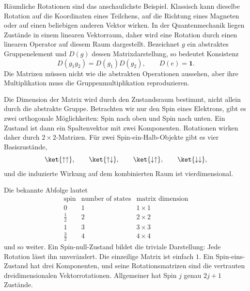 Räumliche Rotationen sind das anschaulichste Beispiel. Klassisch kann dieselbe Rotation auf die Koordinaten eines Teilchens, auf die Richtung eines Magneten oder auf einen beliebigen anderen Vektor wirken. In der Quantenmechanik liegen Zustände in einem linearen Vektorraum, daher wird eine Rotation durch einen linearen Operator auf diesem Raum dargestellt. Bezeichnet \(g\) ein abstraktes Gruppenelement und \(D(g)\) dessen Matrixdarstellung, so bedeutet Konsistenz
\begin{equation}
D(g_1g_2)=D(g_1)D(g_2),
\qquad
D(e)=\boldsymbol 1.
\end{equation}
Die Matrizen müssen nicht wie die abstrakten Operationen aussehen, aber ihre Multiplikation muss die Gruppenmultiplikation reproduzieren.

Die Dimension der Matrix wird durch den Zustandsraum bestimmt, nicht allein durch die abstrakte Gruppe. Betrachten wir nur den Spin eines Elektrons, gibt es zwei orthogonale Möglichkeiten: Spin nach oben und Spin nach unten. Ein Zustand ist dann ein Spaltenvektor mit zwei Komponenten. Rotationen wirken daher durch \(2\times2\)-Matrizen. Für zwei Spin-ein-Halb-Objekte gibt es vier Basiszustände,
\begin{equation}
\ket{\uparrow\uparrow},\qquad
\ket{\uparrow\downarrow},\qquad
\ket{\downarrow\uparrow},\qquad
\ket{\downarrow\downarrow},
\end{equation}
und die induzierte Wirkung auf dem kombinierten Raum ist vierdimensional.

Die bekannte Abfolge lautet
\begin{equation}
\begin{array}{c|c|c}
\text{spin} & \text{number of states} & \text{matrix dimension}\\
\hline
0 & 1 & 1\times1\\
\frac12 & 2 & 2\times2\\
1 & 3 & 3\times3\\
\frac32 & 4 & 4\times4
\end{array}
\end{equation}
und so weiter. Ein Spin-null-Zustand bildet die triviale Darstellung: Jede Rotation lässt ihn unverändert. Die einzeilige Matrix ist einfach \(1\). Ein Spin-eins-Zustand hat drei Komponenten, und seine Rotationsmatrizen sind die vertrauten dreidimensionalen Vektorrotationen. Allgemeiner hat Spin \(j\) genau \(2j+1\) Zustände.

